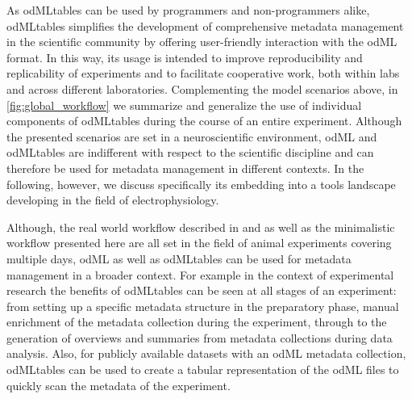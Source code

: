As odMLtables can be used by programmers and non-programmers alike, odMLtables simplifies the development of comprehensive metadata management in the scientific community by offering user-friendly interaction with the odML format. In this way, its usage is intended to improve reproducibility and replicability of experiments and to facilitate cooperative work, both within labs and across different laboratories. Complementing the model scenarios above, in \cref{fig:global_workflow} we summarize and generalize the use of individual components of odMLtables during the course of an entire experiment. Although the presented scenarios are set in a neuroscientific environment, odML and odMLtables are indifferent with respect to the scientific discipline and can therefore be used for metadata management in different contexts. In the following, however, we discuss specifically its embedding into a tools landscape developing in the field of electrophysiology.

Although, the real world workflow described in \cite{Brochier_2018} and \cite{Zehl_2016} as well as the minimalistic workflow presented here are all set in the field of animal experiments covering multiple days, odML as well as odMLtables can be used for metadata management in a broader context. For example in the context of experimental research the benefits of odMLtables can be seen at all stages of an experiment: from setting up a specific metadata structure in the preparatory phase, manual enrichment of the metadata collection during the experiment, through to the generation of overviews and summaries from metadata collections during data analysis. Also, for publicly available datasets with an odML metadata collection, odMLtables can be used to create a tabular representation of the odML files to quickly scan the metadata of the experiment.

